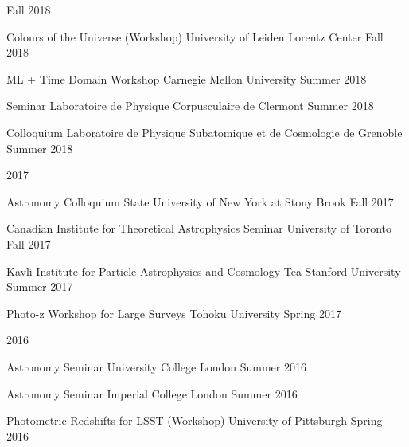 \documentclass[11pt,letterpaper]{article}
\begin{document}
\begin{list}{}{\malzlist}
\begin{list}{}{\malzlist}
			{Fall 2018}
		\item {}
			{Colours of the Universe (Workshop)}
			{University of Leiden Lorentz Center}
			{Fall 2018}
		\item {}
		  {ML + Time Domain Workshop}
			{Carnegie Mellon University}
			{Summer 2018}
		\item {}
		  {Seminar}
			{Laboratoire de Physique Corpusculaire de Clermont}
			{Summer 2018}
		\item {}
		  {Colloquium}
			{Laboratoire de Physique Subatomique et de Cosmologie de Grenoble}
			{Summer 2018}
	\end{list}
	\item 2017
	\nopagebreak\begin{list}{}{\malzlist}
		\item {}
		  {Astronomy Colloquium}
			{State University of New York at Stony Brook}
			{Fall 2017}
		\item {}
		  {Canadian Institute for Theoretical Astrophysics Seminar}
			{University of Toronto}
			{Fall 2017}
		\item {}
		  {Kavli Institute for Particle Astrophysics and Cosmology Tea}
			{Stanford University}
			{Summer 2017}
		\item {}
		  {Photo-z Workshop for Large Surveys}
			{Tohoku University}
			{Spring 2017}
	\end{list}
	\item 2016
	\nopagebreak\begin{list}{}{\malzlist}
		\item {}
		  {Astronomy Seminar}
			{University College London}
			{Summer 2016}
		\item {}
		  {Astronomy Seminar}
			{Imperial College London}
			{Summer 2016}
		\item {}
		  {Photometric Redshifts for LSST (Workshop)}
			{University of Pittsburgh}
			{Spring 2016}
	\end{list}
\end{list}
\end{document}
